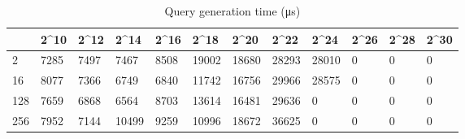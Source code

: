 \begin{table}
\caption{Query generation time (μs)}
\label{tab:query_generation_time}
\begin{tabular}{llllllllllll}
\toprule
 & 2^{10} & 2^{12} & 2^{14} & 2^{16} & 2^{18} & 2^{20} & 2^{22} & 2^{24} & 2^{26} & 2^{28} & 2^{30} \\
\midrule
2 & 7285 & 7497 & 7467 & 8508 & 19002 & 18680 & 28293 & 28010 & 0 & 0 & 0 \\
16 & 8077 & 7366 & 6749 & 6840 & 11742 & 16756 & 29966 & 28575 & 0 & 0 & 0 \\
128 & 7659 & 6868 & 6564 & 8703 & 13614 & 16481 & 29636 & 0 & 0 & 0 & 0 \\
256 & 7952 & 7144 & 10499 & 9259 & 10996 & 18672 & 36625 & 0 & 0 & 0 & 0 \\
\bottomrule
\end{tabular}
\end{table}
